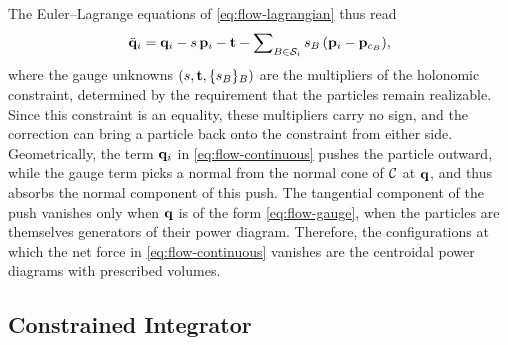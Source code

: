 \documentclass[main.tex]{subfiles}
\begin{document}
The Euler--Lagrange equations of \eqref{eq:flow-lagrangian} thus read
\begin{equation}
  \ddot{\mathbf{q}}_i = \mathbf{q}_i - s\,\mathbf{p}_i - \mathbf{t} - \sum\nolimits_{B \in \mathcal{S}_i} s_B\,(\mathbf{p}_i - \mathbf{p}_{c_B}) ,
  \label{eq:flow-continuous}
\end{equation}
where the gauge unknowns $(s, \mathbf{t}, \{s_B\}_B)$ are the multipliers of the holonomic constraint, determined by the requirement that the particles remain realizable.
Since this constraint is an equality, these multipliers carry no sign, and the correction can bring a particle back onto the constraint from either side.
Geometrically, the term $\mathbf{q}_i$ in \eqref{eq:flow-continuous} pushes the particle outward, while the gauge term picks a normal from the normal cone of $\mathcal{C}$ at $\mathbf{q}$, and thus absorbs the normal component of this push.
The tangential component of the push vanishes only when $\mathbf{q}$ is of the form \eqref{eq:flow-gauge}, \ie when the particles are themselves generators of their power diagram.
Therefore, the configurations at which the net force in \eqref{eq:flow-continuous} vanishes are the centroidal power diagrams with prescribed volumes. %

\subsection{Constrained Integrator}
\label{sec:flow-constrained}
\end{document}
